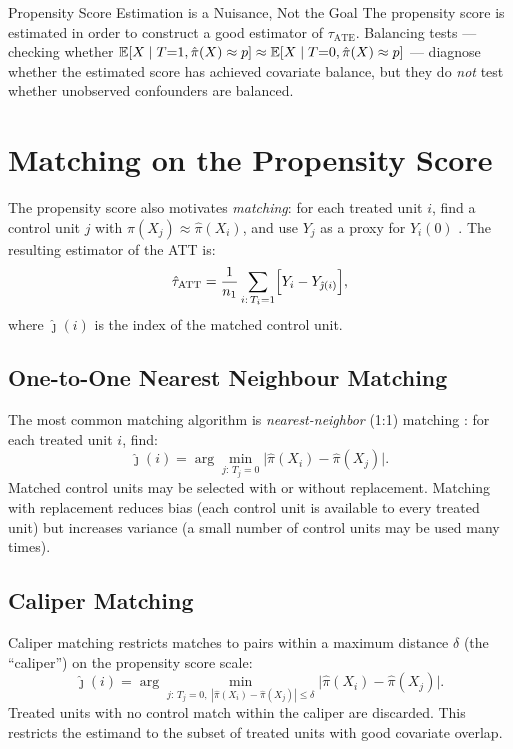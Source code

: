 \documentclass[master.tex]{subfiles}
\begin{document}
\begin{warn}{Propensity Score Estimation is a Nuisance, Not the Goal}
The propensity score is estimated in order to construct a good estimator
of $\tau_{\mathrm{ATE}}$.  Balancing tests --- checking whether
$\mathbb{E}[X \mid T{=}1, \hat\pi(X) \approx p]
 \approx \mathbb{E}[X \mid T{=}0, \hat\pi(X) \approx p]$ ---
diagnose whether the estimated score has achieved covariate balance, but
they do \emph{not} test whether unobserved confounders are balanced.
\end{warn}

\section{Matching on the Propensity Score}

The propensity score also motivates \emph{matching}: for each treated
unit $i$, find a control unit $j$ with $\hat\pi(X_j) \approx
\hat\pi(X_i)$, and use $Y_j$ as a proxy for $Y_i(0)$
\citep{abadie2006large, abadie2016matching}.  The resulting
estimator of the ATT is:
\[
  \hat\tau_{\mathrm{ATT}}
  = \frac{1}{n_1}\sum_{i:\, T_i=1}
    \Bigl[Y_i - Y_{\hat\jmath(i)}\Bigr],
\]
where $\hat\jmath(i)$ is the index of the matched control unit.

\subsection{One-to-One Nearest Neighbour Matching}

The most common matching algorithm is \emph{nearest-neighbor} (1:1)
matching \citep{abadie2006large}: for each treated unit $i$, find:
\[
  \hat\jmath(i) = \arg\min_{j:\, T_j=0}
    \bigl|\hat\pi(X_i) - \hat\pi(X_j)\bigr|.
\]
Matched control units may be selected with or without replacement.
Matching with replacement reduces bias (each control unit is available
to every treated unit) but increases variance (a small number of
control units may be used many times).

\subsection{Caliper Matching}

Caliper matching restricts matches to pairs within a maximum distance
$\delta$ (the ``caliper'') on the propensity score scale:
\[
  \hat\jmath(i) = \arg\min_{j:\, T_j=0,\;
    |\hat\pi(X_i) - \hat\pi(X_j)| \le \delta}
    \bigl|\hat\pi(X_i) - \hat\pi(X_j)\bigr|.
\]
Treated units with no control match within the caliper are discarded.
This restricts the estimand to the subset of treated units with good
covariate overlap.
\end{document}

